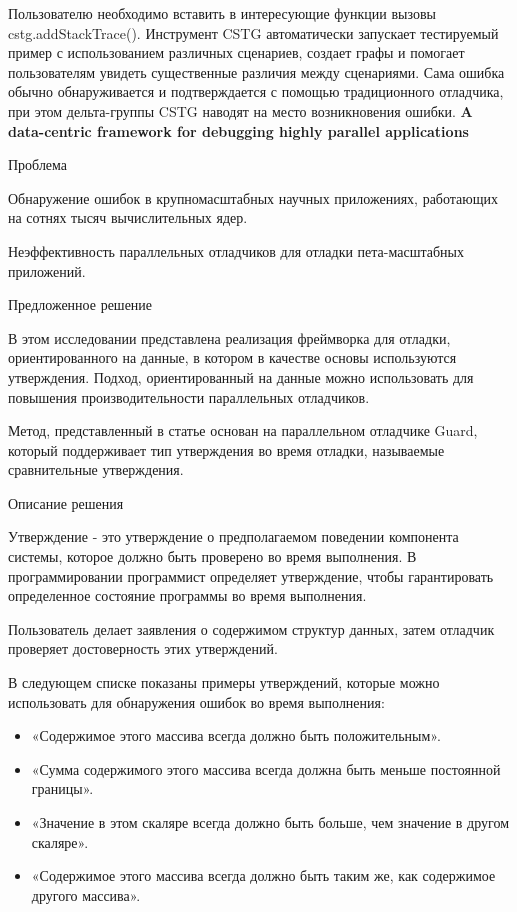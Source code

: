 Пользователю необходимо вставить в интересующие функции вызовы cstg.addStackTrace(). Инструмент CSTG автоматически запускает тестируемый пример с использованием различных сценариев, создает графы и помогает пользователям увидеть существенные различия между сценариями. Сама ошибка обычно обнаруживается и подтверждается с помощью традиционного отладчика, при этом дельта-группы CSTG наводят на место возникновения ошибки.
\newline\newline
\textbf{A data-centric framework for debugging highly parallel applications}
\newline

Проблема

Обнаружение ошибок в крупномасштабных научных приложениях, работающих на сотнях тысяч вычислительных ядер.

Неэффективность параллельных отладчиков для отладки пета-масштабных приложений.
\newline

Предложенное решение

В этом исследовании представлена реализация фреймворка для отладки, ориентированного на данные, в котором в качестве основы используются утверждения.
Подход, ориентированный на данные можно использовать для повышения производительности параллельных отладчиков. 

Метод, представленный в статье основан на параллельном отладчике Guard, который поддерживает тип утверждения во время отладки, называемые сравнительные утверждения. 
\newline

Описание решения

Утверждение - это утверждение о предполагаемом поведении компонента системы, которое должно быть проверено во время выполнения. В программировании программист определяет утверждение, чтобы гарантировать определенное состояние программы во время выполнения.

Пользователь делает заявления о содержимом структур данных, затем отладчик проверяет достоверность этих утверждений.

В следующем списке показаны примеры утверждений, которые можно использовать для обнаружения ошибок во время выполнения:

\begin{itemize}
	\item «Содержимое этого массива всегда должно быть положительным».
	\item «Сумма содержимого этого массива всегда должна быть меньше постоянной границы».
	\item «Значение в этом скаляре всегда должно быть больше, чем значение в другом скаляре».
	\item «Содержимое этого массива всегда должно быть таким же, как содержимое другого массива». 
\end{itemize}

